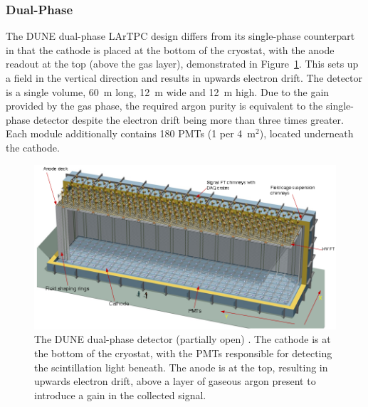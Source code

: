 \subsubsection{Dual-Phase}\label{sec:DUNEDualPhase}

The DUNE dual-phase LArTPC design differs from its single-phase counterpart in that the cathode is placed at the bottom of the cryostat, with the anode readout at the top (above the gas layer), demonstrated in Figure~\ref{fig:DUNEDualPhase}.  This sets up a field in the vertical direction and results in upwards electron drift.  The detector is a single volume, 60~m long, 12~m wide and 12~m high.  Due to the gain provided by the gas phase, the required argon purity is equivalent to the single-phase detector despite the electron drift being more than three times greater.  Each module additionally contains 180 PMTs (1 per 4~m$^2$), located underneath the cathode.

\begin{figure}
  \centering
  \includegraphics[width=14cm]{DUNEDualPhase.png}
  \caption[The DUNE dual-phase detector (partially open).]{The DUNE dual-phase detector (partially open) \cite{DUNECDR4}.  The cathode is at the bottom of the cryostat, with the PMTs responsible for detecting the scintillation light beneath.  The anode is at the top, resulting in upwards electron drift, above a layer of gaseous argon present to introduce a gain in the collected signal.}
  \label{fig:DUNEDualPhase}
\end{figure}

